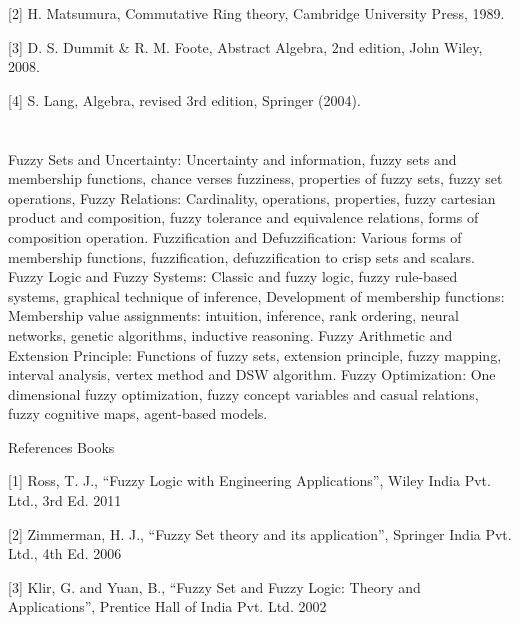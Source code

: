 [2] H. Matsumura, Commutative Ring theory, Cambridge University Press, 1989.  

[3] D. S. Dummit \& R. M. Foote, Abstract Algebra, 2nd edition, John Wiley, 2008.  

[4] S. Lang, Algebra, revised 3rd edition, Springer (2004). 

 

\section{\dsccourseinfo}

 

Fuzzy Sets and Uncertainty: Uncertainty and information, fuzzy sets and membership functions, chance verses fuzziness, properties of fuzzy sets, fuzzy set operations, Fuzzy Relations: Cardinality, operations, properties, fuzzy cartesian product and composition, fuzzy tolerance and equivalence relations, forms of composition operation. Fuzzification and Defuzzification: Various forms of membership functions, fuzzification, defuzzification to crisp sets and scalars. Fuzzy Logic and Fuzzy Systems: Classic and fuzzy logic, fuzzy rule-based systems, graphical technique of inference, Development of membership functions: Membership value assignments: intuition, inference, rank ordering, neural networks, genetic algorithms, inductive reasoning. Fuzzy Arithmetic and Extension Principle: Functions of fuzzy sets, extension principle, fuzzy mapping, interval analysis, vertex method and DSW algorithm. Fuzzy Optimization: One dimensional fuzzy optimization, fuzzy concept variables and casual relations, fuzzy cognitive maps, agent-based models.   

 

References Books  

[1] Ross, T. J., “Fuzzy Logic with Engineering Applications”, Wiley India Pvt. Ltd., 3rd Ed. 2011  

[2] Zimmerman, H. J., “Fuzzy Set theory and its application”, Springer India Pvt. Ltd., 4th Ed. 2006  

[3] Klir, G. and Yuan, B., “Fuzzy Set and Fuzzy Logic: Theory and Applications”, Prentice Hall of India Pvt. Ltd. 2002  

\section{\dsccourseinfo} 

